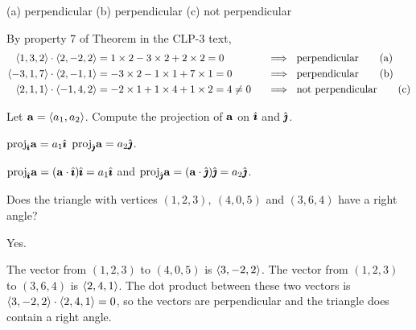\begin{answer}
(a) perpendicular\qquad
(b) perpendicular\qquad
(c) not perpendicular
\end{answer}

\begin{solution}
\leqnomode
By property 7 of Theorem  in the CLP-3 text,
\begin{alignat*}{3}
\llt 1,3,2\rgt \cdot\llt 2,-2,2\rgt 
&=1\times2-3\times 2+2\times2=0\ 
&&\implies\ \text{perpendicular}
\tag{a} \\
\llt -3,1,7\rgt \cdot\llt 2,-1,1\rgt 
&=-3\times2-1\times 1+7\times1=0\ 
&&\implies\ \text{perpendicular}
\tag{b} \\
\llt 2,1,1\rgt \cdot\llt -1,4,2\rgt 
&=-2\times1+1\times 4+1\times2=4\ne 0\ 
&&\implies\ \text{not perpendicular}
\tag{c}
\end{alignat*}
\reqnomode
\end{solution}

\begin{question}
Let $\mathbf{a}=\left< a_1,a_2\right>$. Compute the projection of $\mathbf{a}$ on
$\hat{\pmb{\imath}}$ and $\hat{\pmb{\jmath}}$.
\end{question}


\begin{answer}
$\text{proj}_{\hat{\pmb{\imath}}}\mathbf{a}=a_1\hat{\pmb{\imath}}$\qquad
$\text{proj}_{\hat{\pmb{\jmath}}}\mathbf{a}=a_2\hat{\pmb{\jmath}}$.
\end{answer}

\begin{solution}
$\text{proj}_{\hat{\pmb{\imath}}}\mathbf{a}=(\mathbf{a}\cdot\hat{\pmb{\imath}})\hat{\pmb{\imath}}
=a_1\hat{\pmb{\imath}}$ and
$\text{proj}_{\hat{\pmb{\jmath}}}\mathbf{a}=(\mathbf{a}\cdot\hat{\pmb{\jmath}})\hat{\pmb{\jmath}}
=a_2\hat{\pmb{\jmath}}$.
\end{solution}

\begin{question}
Does the triangle with vertices $(1,2,3),\ (4,0,5)$ and $(3,6,4)$
have a right angle?
\end{question}


\begin{answer}
Yes.
\end{answer}

\begin{solution}
The vector from $(1,2,3)$ to $(4,0,5)$ is $\left< 3,-2,2\right>$.
The vector from $(1,2,3)$ to $(3,6,4)$ is $\left< 2,4,1\right>$.
The dot product between these two vectors is 
$\left< 3,-2,2\right>\cdot\left< 2,4,1\right>=0$,
so the vectors are perpendicular and the triangle does contain a right
angle.

\end{solution}

